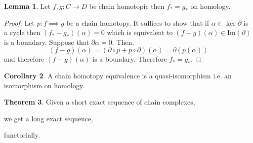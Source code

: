 \documentclass[12pt]{article}
\renewcommand{\Im}[1]{\mathrm{Im}(#1)}
\theoremstyle{remark}
\theoremstyle{definition}
\newtheorem{theorem}{Theorem}[section]
\newtheorem{lemma}[theorem]{Lemma}
\newtheorem{corollary}[theorem]{Corollary}
\begin{document}
\begin{lemma}
Let $f,g : C \to D$ be chain homotopic then $f_* = g_*$ on homology.
\end{lemma}

\begin{proof}
Let $p : f \implies g$ be a chain homotopy. It suffices to show that if $\alpha \in \ker{\partial}$ is a cycle then $(f_* - g_*)(\alpha) = 0$ which is equivalent to $(f - g)(\alpha) \in \Im{\partial}$ is a boundary. Suppose that $\partial \alpha = 0$. Then, 
\[ (f - g)(\alpha) = (\partial \circ p + p \circ \partial)(\alpha) = \partial(p(\alpha)) \]
and therefore $(f - g)(\alpha)$ is a boundary. Therefore $f_* = g_*$. 
\end{proof}

\begin{corollary}
A chain homotopy equivalence is a quasi-isomorphism i.e. an isomorphism on homology.
\end{corollary}

\begin{theorem}
Given a short exact sequence of chain complexes,
\begin{center}
\end{center}
we get a long exact sequence,
\begin{center}
\end{center}
functorially.
\end{theorem}
\end{document}
